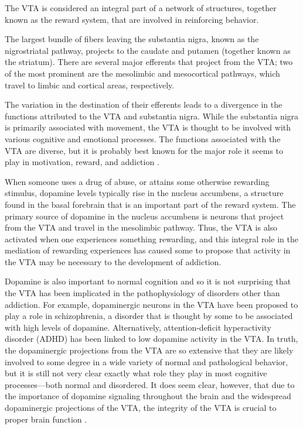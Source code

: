 \documentclass[../structure.tex]{subfiles}
\begin{document}
		The VTA is considered an integral part of a network of structures, together known as the reward system, that are involved in reinforcing behavior.
		
		The largest bundle of fibers leaving the substantia nigra, known as the nigrostriatal pathway, projects to the caudate and putamen (together known as the striatum). There are several major efferents that project from the VTA; two of the most prominent are the mesolimbic and mesocortical pathways, which travel to limbic and cortical areas, respectively.
		
		The variation in the destination of their efferents leads to a divergence in the functions attributed to the VTA and substantia nigra. While the substantia nigra is primarily associated with movement, the VTA is thought to be involved with various cognitive and emotional processes. The functions associated with the VTA are diverse, but it is probably best known for the major role it seems to play in motivation, reward, and addiction \cite{Kalivas1993}.
		
		When someone uses a drug of abuse, or attains some otherwise rewarding stimulus, dopamine levels typically rise in the nucleus accumbens, a structure found in the basal forebrain that is an important part of the reward system. The primary source of dopamine in the nucleus accumbens is neurons that project from the VTA and travel in the mesolimbic pathway. Thus, the VTA is also activated when one experiences something rewarding, and this integral role in the mediation of rewarding experiences has caused some to propose that activity in the VTA may be necessary to the development of addiction.
		
		Dopamine is also important to normal cognition and so it is not surprising that the VTA has been implicated in the pathophysiology of disorders other than addiction. For example, dopaminergic neurons in the VTA have been proposed to play a role in schizophrenia, a disorder that is thought by some to be associated with high levels of dopamine. Alternatively, attention-deficit hyperactivity disorder (ADHD) has been linked to low dopamine activity in the VTA. In truth, the dopaminergic projections from the VTA are so extensive that they are likely involved to some degree in a wide variety of normal and pathological behavior, but it is still not very clear exactly what role they play in most cognitive processes---both normal and disordered. It does seem clear, however, that due to the importance of dopamine signaling throughout the brain and the widespread dopaminergic projections of the VTA, the integrity of the VTA is crucial to proper brain function \cite{Kalivas1993}.
	
\end{document}
